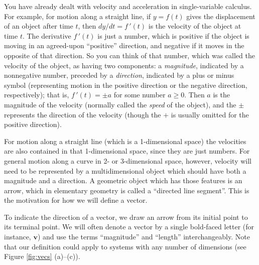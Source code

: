 You have already dealt with velocity and acceleration in single-variable calculus.  For example, for motion along a
straight line, if $y = f(t)$ gives the displacement of an object after time $t$, then $dy/dt = f\,'(t)$ is the velocity
of the object at time $t$.  
The derivative
$f\,'(t)$ is just a number, which is positive if the object is moving in an
agreed-upon ``positive'' direction, and negative if it moves in the opposite of that direction. So you can think of
that number, which was called the velocity of the object, as having two components: a \emph{magnitude}, indicated by
a nonnegative number, preceded by a \emph{direction}, indicated by a plus or minus symbol (representing motion in the
positive direction or the negative direction, respectively); that is, $f\,'(t) = \pm a$ for some number $a \ge 0$.  
Then
$a$ is the magnitude of the velocity (normally called the \emph{speed} of the object), and the $\pm$ represents the
direction of the velocity (though the $+$ is usually omitted for the positive direction).

For motion along a straight line 
(which is a 1-dimensional space) 
the velocities are also contained in that 1-dimensional space, since they are just numbers.  
For general motion along a curve in 2- or 3-dimensional space,
however, velocity will need to be represented by a multidimensional object which should have both a magnitude and a
direction.  
A geometric object which has those features is an arrow, which in elementary geometry is called a
``directed line segment''.  This is the motivation for how we will define a vector.


To indicate the direction of a vector, we draw an arrow from its initial point to its terminal point. 
We will often denote a vector by a single bold-faced letter (for instance, $\mathbf{v}$) 
and use the terms
``magnitude'' and ``length'' interchangeably.
Note that our definition could apply to systems with any number of dimensions (see Figure \ref{fig:vecs}
(a)--(c)).

